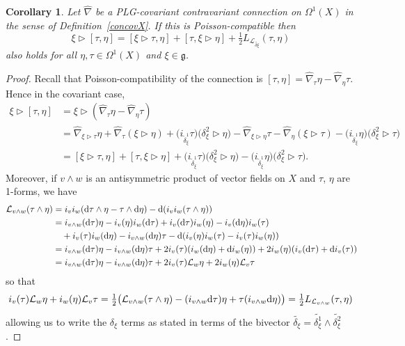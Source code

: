 \documentclass[pdftex]{sigma}
\numberwithin{equation}{section}
\newtheorem{Corollary}[Theorem]{Corollary}
\newcommand{\<}{{\langle}}
\renewcommand{\>}{{\rangle}}
\newcommand{\CL}{{\mathcal{L}}}
\newcommand{\extd}{{\rm d}}
\newcommand{\la}{{\triangleright}}
\newcommand{\cg}{{\mathfrak{g}}}
\begin{document}
\begin{Corollary}\label{corconcovX} Let $\hat\nabla$ be a PLG-covariant contravariant connection on $\Omega^1(X)$ in the sense of Definition~{\rm \ref{concovX}}. If this is Poisson-compatible then
\begin{equation*}%
\xi\la[\tau,\eta]=[\xi\la\tau,\eta]+[\tau,\xi\la\eta]+\tfrac{1}{2} L_{\CL_{\tilde{\delta\xi}}}(\tau,\eta)\end{equation*}
also holds for all $\eta,\tau\in \Omega^1(X)$ and $\xi\in \cg$.
\end{Corollary}
\begin{proof}
Recall that Poisson-compatibility of the connection is $[\tau,\eta]=\hat\nabla_\tau\eta-\hat\nabla_\eta\tau$. Hence in the covariant case,
\begin{align*}
\xi\la[\tau,\eta]& =\xi\la(\hat\nabla_\tau\eta-\hat\nabla_\eta\tau)\\
&=\hat\nabla_{\xi\la\tau}\eta+\hat\nabla_\tau(\xi\la\eta)+\big(i_{\tilde\delta_\xi^1}\tau\big) \big(\delta^2_\xi\la\eta\big)-\hat\nabla_{\xi\la\eta}\tau-\hat\nabla_\eta(\xi\la\tau)-\big(i_{\tilde\delta_\xi^1}\eta\big) \big(\delta^2_\xi\la\tau\big)\\
& =[\xi\la\tau,\eta]+[\tau,\xi\la\eta]+\big(i_{\tilde\delta_\xi^1}\tau\big) \big(\delta^2_\xi\la\eta\big)-\big(i_{\tilde\delta_\xi^1}\eta\big)\big(\delta^2_\xi\la\tau\big).
\end{align*}
Moreover, if $v\wedge w$ is an antisymmetric product of vector fields on $X$ and $\tau$, $\eta$ are 1-forms, we have
\begin{align*}
\CL_{v\wedge w}(\tau\wedge\eta)&=i_vi_w(\extd\tau\wedge \eta-\tau\wedge\extd\eta)-\extd(i_{v}i_w(\tau\wedge\eta))\\
&=i_{v\wedge w}(\extd \tau)\eta-i_v(\eta)i_w(\extd \tau)+i_v(\extd \tau)i_w(\eta)-i_v(\extd\eta)i_w(\tau)\\
&\quad{}+i_v(\tau)i_w(\extd\eta)-i_{v\wedge w}(\extd\eta)\tau -\extd(i_v(\eta)i_w(\tau)-i_v(\tau)i_w(\eta))\\
&=i_{v\wedge w}(\extd \tau)\eta -i_{v\wedge w}(\extd\eta)\tau + 2 i_v(\tau)(i_w(\extd \eta)+\extd i_w(\eta))+2 i_w(\eta)(i_v(\extd \tau)+\extd i_v(\tau))\!\\
&=i_{v\wedge w}(\extd \tau)\eta -i_{v\wedge w}(\extd\eta)\tau + 2 i_v(\tau)\CL_w\eta+2 i_w(\eta)\CL_v\tau \end{align*}
so that
\[ i_v(\tau)\CL_w\eta+ i_w(\eta)\CL_v\tau=\tfrac{1}{2} \big( \CL_{v\wedge w}(\tau\wedge\eta)-( i_{v\wedge w}\extd \tau)\eta+ \tau (i_{v\wedge w}\extd\eta)\big)=\tfrac{1}{2} L_{\CL_{v\wedge w}}(\tau,\eta)\]
allowing us to write the $\delta_\xi$ terms as stated in terms of the bivector $\tilde{\delta_\xi}=\tilde{\delta_\xi^1}\wedge\tilde{\delta_\xi^2}$.
\end{proof}
\end{document}
